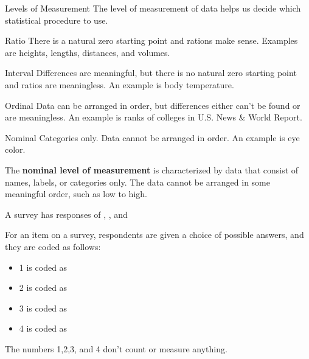 \documentclass{beamer}
\begin{document}
\begin{frame}
\begin{block}{Levels of Measurement}
The level of measurement of data helps us decide which statistical procedure to use. 
\end{block}\pause

\begin{block}{Ratio}
There is a natural zero starting point and rations make sense. Examples are heights, lengths, distances, and volumes.
\end{block}\pause

\begin{block}{Interval}
Differences are meaningful, but there is no natural zero starting point and ratios are meaningless. An example is body temperature.
\end{block}\pause

\begin{block}{Ordinal}
Data can be arranged in order, but differences either can't be found or are meaningless. An example is ranks of colleges in U.S. News \& World Report.
\end{block}\pause

\begin{block}{Nominal}
Categories only. Data cannot be arranged in order. An example is eye color.
\end{block}
\end{frame}

\begin{frame}
\begin{definition}
The \textbf{nominal level of measurement} is characterized by data that consist of names, labels, or categories only. The data cannot be arranged in some meaningful order, such as low to high.
\end{definition}\pause

\begin{example}
A survey has responses of , , and 
\end{example}\pause

\begin{example}
For an item on a survey, respondents are given a choice of possible answers, and they are coded as follows:
\begin{itemize}
\item[] 1 is coded as 
\item[] 2 is coded as 
\item[] 3 is coded as 
\item[] 4 is coded as 
\end{itemize}
The numbers 1,2,3, and 4 don't count or measure anything.
\end{example}
\end{frame}
\end{document}
